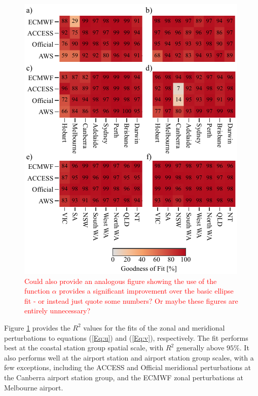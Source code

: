 \documentclass[alpha-refs]{wiley-article}
\begin{document}
\begin{figure}
\centering
\includegraphics{r_squared.pdf}
\caption{\textcolor{red}{Could also provide an analogous figure showing the use of the function $\alpha$ provides a significant improvement over the basic ellipse fit - or instead just quote some numbers? Or maybe these figures are entirely unnecessary?}}
\label{Fig:r_squared}
\end{figure}

Figure \ref{Fig:r_squared} provides the $R^2$ values for the fits of the zonal and meridional perturbations to equations (\ref{Eq:u}) and (\ref{Eq:v}), respectively. The fit performs best at the coastal station group spatial scale, with $R^2$ generally above $95\%$. It also performs well at the airport station and airport station group scales, with a few exceptions, including the ACCESS and Official meridional perturbations at the Canberra airport station group, and the ECMWF zonal perturbations at Melbourne airport. 
\end{document}
